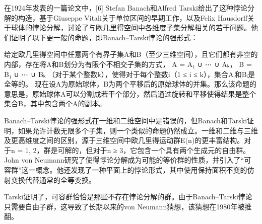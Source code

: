 在1924年发表的一篇论文中，[6] Stefan Banach和Alfred Tarski给出了这种悖论分解的构造，基于Giuseppe Vitali关于单位区间的早期工作，以及Felix Hausdorff关于球体的悖论分解，讨论了与欧几里得空间中各维度子集分解相关的若干问题。他们证明了以下更一般的命题，即Banach–Tarski悖论的强形式：

给定欧几里得空间中任意两个有界子集A和B（至少三维空间），且它们都有非空的内部，存在将A和B划分为有限个不相交子集的方式，  
A = A₁ ∪ ⋯ ∪ Aₖ，  
B = B₁ ∪ ⋯ ∪ Bₖ （对于某个整数k），使得对于每个整数i（1 ≤ i ≤ k），集合Aᵢ和Bᵢ是全等的。  
现在设A为原始球体，B为两个平移后的原始球体的并集。那么该命题的意思是，原始球体A可以分割成若干个部分，然后通过旋转和平移使得结果是整个集合B，其中包含两个A的副本。

Banach–Tarski悖论的强形式在一维和二维空间中是错误的，但Banach和Tarski证明，如果允许计数无限多个子集，则一个类似的命题仍然成立。一维和二维与三维及更高维度之间的区别，源于三维空间中欧几里得运动群E(n)的更丰富结构。对于n = 1, 2，群是可解的，但对于n ≥ 3，它包含一个具有两个生成元的自由群。John von Neumann研究了使得悖论分解成为可能的等价群的性质，并引入了“可容群”这一概念。他还发现了一种平面上的悖论形式，其中使用保持面积不变的仿射变换代替通常的全等变换。

Tarski证明了，可容群恰恰是那些不存在悖论分解的群。由于Banach–Tarski悖论只需要自由子群，这导致了长期以来的von Neumann猜想，该猜想在1980年被推翻。